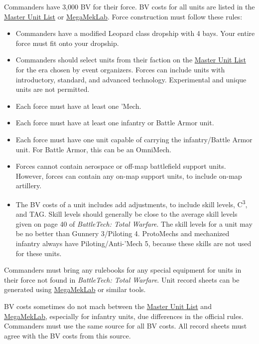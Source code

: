 Commanders have 3,000 BV for their force.
BV costs for all units are listed in the \href{http://www.masterunitlist.info}{Master Unit List} or \href{https://megamek.org}{MegaMekLab}.
Force construction must follow these rules:

\begin{itemize}

\item Commanders have a modified Leopard class dropship with 4 bays.
Your entire force must fit onto your dropship.

\item Commanders should select units from their faction on the \href{http://www.masterunitlist.info/}{Master Unit List} for the era chosen by event organizers.
Forces can include units with introductory, standard, and advanced technology.
Experimental and unique units are not permitted.

\item Each force must have at least one 'Mech.

\item Each force must have at least one infantry or Battle Armor unit.

\item Each force must have one unit capable of carrying the infantry/Battle Armor unit.
For Battle Armor, this can be an OmniMech.

\item Forces cannot contain aerospace or off-map battlefield support units.
However, forces can contain any on-map support units, to include on-map artillery.

\item The BV costs of a unit includes add adjustments, to include skill levels, C\textsuperscript{3}, and TAG.
Skill levels should generally be close to the average skill levels given on page 40 of \emph{BattleTech: Total Warfare}.
The skill levels for a unit may be no better than Gunnery 3/Piloting 4.
ProtoMechs and mechanized infantry always have Piloting/Anti-'Mech 5, because these skills are not used for these units.

\end{itemize}

Commanders must bring any rulebooks for any special equipment for units in their force not found in \emph{BattleTech: Total Warfare}.
Unit record sheets can be generated using \href{https://megamek.org}{MegaMekLab} or similar tools.

BV costs sometimes do not mach between the \href{http://www.masterunitlist.info}{Master Unit List} and \href{https://megamek.org}{MegaMekLab}, especially for infantry units, due differences in the official rules.
Commanders must use the same source for all BV costs.
All record sheets must agree with the BV costs from this source.

